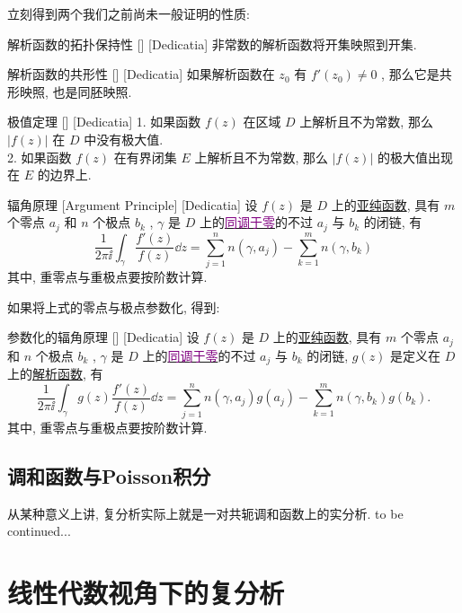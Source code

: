 \documentclass[UTF8]{ctexart}
\newcommand{\hyperrefc}[2]{\hyperref[#1]{\textcolor{purple}{#2}}}
\newcommand{\continued}{{\Large to be continued...}}
\newcommand{\AnalyticalFunction}{\hyperref[dfn:AnalyticalFunction]{解析函数}}
\newcommand{\MeromorphicFunction}{\hyperref[dfn:MeromorphicFunction]{亚纯函数}}
\begin{document}
立刻得到两个我们之前尚未一般证明的性质: 
\begin{crl}
    [UUID]
    {解析函数的拓扑保持性}
    []
    [Dedicatia]
    非常数的解析函数将开集映照到开集. 
\end{crl}
\begin{crl}
    [UUID]
    {解析函数的共形性}
    []
    [Dedicatia]
    如果解析函数在 \( z_0 \) 有 \( f'(z_0)\neq 0 \) , 那么它是共形映照, 也是同胚映照. 
\end{crl}
\begin{thm}
    [UUID]
    {极值定理}
    []
    [Dedicatia]
    1. 如果函数 \( f(z) \) 在区域 \( D \) 上解析且不为常数, 那么 \( |f(z)| \) 在 \( D \) 中没有极大值. \\
    2. 如果函数 \( f(z) \) 在有界闭集 \( E \) 上解析且不为常数, 那么 \( |f(z)| \) 的极大值出现在 \( E \) 的边界上. 
\end{thm}
\begin{crl}
    [UUID]
    {辐角原理}
    [Argument Principle]
    [Dedicatia]
    设 \( f(z) \) 是 \( D \) 上的\MeromorphicFunction , 具有 \( m \) 个零点 \( a_j \) 和 \( n \) 个极点 \( b_k \) ,  \( \gamma \) 是 \( D \) 上的\hyperrefc{dfn:NullHomologous}{同调于零}的不过 \( a_j \) 与 \( b_k \) 的闭链, 有
    \[\frac{1}{2\pi\ii}\int_\gamma\frac{f'(z)}{f(z)}\dd{z}=\sum_{j = 1}^{n} n(\gamma,a_j)-\sum_{k = 1}^{m} n(\gamma,b_k)  \]
    其中, 重零点与重极点要按阶数计算. 
\end{crl}
如果将上式的零点与极点参数化, 得到: 
\begin{crl}
    [UUID]
    {参数化的辐角原理}
    []
    [Dedicatia]
    设 \( f(z) \) 是 \( D \) 上的\MeromorphicFunction , 具有 \( m \) 个零点 \( a_j \) 和 \( n \) 个极点 \( b_k \) ,  \( \gamma \) 是 \( D \) 上的\hyperrefc{dfn:NullHomologous}{同调于零}的不过 \( a_j \) 与 \( b_k \) 的闭链,  \( g(z) \) 是定义在 \( D \) 上的\AnalyticalFunction , 有
    \[\frac{1}{2\pi\ii}\int_\gamma g(z)\frac{f'(z)}{f(z)}\dd{z}=\sum_{j = 1}^{n} n(\gamma,a_j)g(a_j)-\sum_{k = 1}^{m} n(\gamma,b_k)g(b_k).  \]
    其中, 重零点与重极点要按阶数计算. 
\end{crl}
\subsection{调和函数与Poisson积分}
从某种意义上讲, 复分析实际上就是一对共轭调和函数上的实分析. 
\continued

\section{线性代数视角下的复分析}
\end{document}
